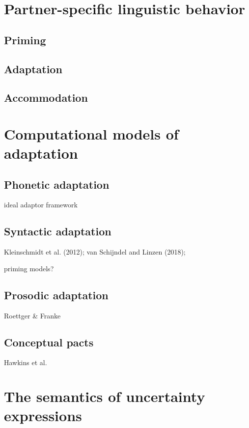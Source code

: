 \section{Partner-specific linguistic behavior}

\subsection{Priming}

\subsection{Adaptation}



\subsection{Accommodation}


\section{Computational models of adaptation}

\subsection{Phonetic adaptation} ideal adaptor framework

\subsection{Syntactic adaptation} 

Kleinschmidt et al. (2012); 
van Schijndel and Linzen (2018); 

priming models?

\subsection{Prosodic adaptation} Roettger \& Franke

\subsection{Conceptual pacts} Hawkins et al.




\section{The semantics of uncertainty expressions}

